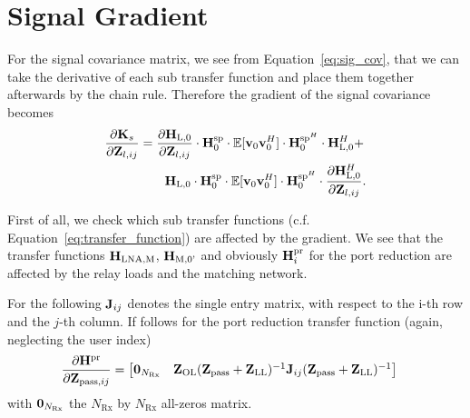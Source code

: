 \section{Signal Gradient}
\label{sec:signal_gradient}
 For the signal covariance matrix, we see from Equation~\eqref{eq:sig_cov}, that we can take the derivative of each sub transfer function and place them together afterwards by the chain rule. 
Therefore the gradient of the signal covariance becomes
\begin{align}
\label{eq:signal_gradient}\nonumber
\frac{\partial\mathbf{K}_s}{\partial\mathbf{Z}_{l,ij}} &= \frac{\partial\mathbf{H}_\text{L,0}}{\partial\mathbf{Z}_{l,ij}}\cdot \mathbf{H}_{0}^{\text{sp}}
	\cdot\mathbb{E}[\mathbf{v}_0\mathbf{v}_0^H]\cdot
	\mathbf{H}_{0}^{\text{sp}^H} \cdot \mathbf{H}_\text{L,0}^H + \\
&\qquad	\mathbf{H}_\text{L,0}\cdot \mathbf{H}_{0}^{\text{sp}}
	\cdot\mathbb{E}[\mathbf{v}_0\mathbf{v}_0^H]\cdot
	\mathbf{H}_{0}^{\text{sp}^H} \cdot \frac{\partial\mathbf{H}_\text{L,0}^H }{\partial\mathbf{Z}_{l,ij}}.
\end{align}

First of all, we check which sub transfer functions (c.f. Equation~\eqref{eq:transfer_function}) are affected by the gradient.
We see that the transfer functions $\mathbf{H}_\text{LNA,M}$, $\mathbf{H}_\text{M,0'}$ and obviously $\mathbf{H}_i^{\text{pr}}$ for the port reduction are affected by the relay loads and the matching network.

For the following $\mathbf{J}_{ij}$ denotes the single entry matrix, with respect to the i-th row and the $j$-th column.
If follows for the port reduction transfer function (again, neglecting the user index)
\begin{align}
\label{eq:H0_sig_grad}
\frac{\partial\mathbf{H}^{\text{pr}}}{\partial\mathbf{Z}_{\text{pass},ij}}&=
\begin{bmatrix}
\mathbf{0}_{N_\text{Rx}} & \mathbf{Z}_\text{OL}(\mathbf{Z}_\text{pass}+\mathbf{Z}_\text{LL})^{-1}\mathbf{J}_{ij}(\mathbf{Z}_{\text{pass}}+\mathbf{Z}_\text{LL})^{-1}
\end{bmatrix}
\end{align}
with $\mathbf{0}_{N_\text{Rx}}$ the ${N_\text{Rx}}$ by ${N_\text{Rx}}$ all-zeros matrix.

